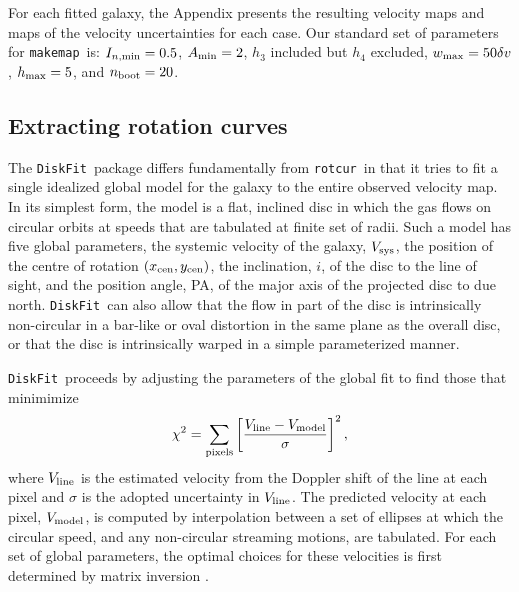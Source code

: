 \documentclass[letterpaper,fleqn,usenatbib]{mnras}
\def\DFt{{\tt DiskFit}}
\def\mkm{{\tt makemap}}
\def\rtc{{\tt rotcur}}
\begin{document}
For each fitted galaxy, the Appendix presents the resulting velocity
maps and maps of the velocity uncertainties for each case.  Our
standard set of parameters for \mkm\ is: $ I_{n, \rm min} = 0.5$, $A_{\rm
  min} = 2$, $h_3$ included but $h_4$ excluded, $w_{\rm max} =
50\delta v$, $h_{\rm max} = 5$, and $n_{\rm boot}=20$.

\subsection{Extracting rotation curves}
\label{sec.DiskFit}
The \DFt\ package differs fundamentally from \rtc\ in that it tries to
fit a single idealized global model for the galaxy to the entire
observed velocity map.  In its simplest form, the model is a flat,
inclined disc in which the gas flows on circular orbits at speeds that
are tabulated at finite set of radii.  Such a model has five global
parameters, the systemic velocity of the galaxy, $V_{\rm sys}$, the
position of the centre of rotation $(x_{\rm cen}, y_{\rm cen})$, the
inclination, $i$, of the disc to the line of sight, and the position
angle, PA, of the major axis of the projected disc to due north.
\DFt\ can also allow that the flow in part of the disc is
intrinsically non-circular in a bar-like or oval distortion in the
same plane as the overall disc, or that the disc is intrinsically
warped in a simple parameterized manner.

\DFt\ proceeds by adjusting the parameters of the global fit to find
those that minimimize
\begin{equation}
\chi^2 = \sum_{\rm pixels} \left[ { V_{\rm line} - V_{\rm model} \over \sigma} \right]^2,
\label{eq.chisq}
\end{equation}
where $V_{\rm line}$ is the estimated velocity from the Doppler shift
of the line at each pixel and $\sigma$ is the adopted uncertainty in
$V_{\rm line}$.  The predicted velocity at each pixel, $V_{\rm
  model}$, is computed by interpolation between a set of ellipses at
which the circular speed, and any non-circular streaming motions, are
tabulated.  For each set of global parameters, the optimal choices for
these velocities is first determined by matrix inversion
\citep[see][for details]{SS07}.
\end{document}
